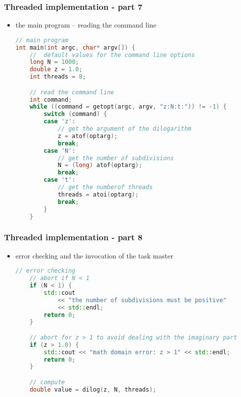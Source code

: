\begin{frame}[fragile]
%
  \frametitle{Threaded implementation - part 7}
%
  \begin{itemize}
  \item the main program -- reading the command line
  \begin{lstlisting}[language=c++,name=threaded]
// main program
int main(int argc, char* argv[]) {
    //  default values for the command line options
    long N = 1000;
    double z = 1.0;
    int threads = 8;

    // read the command line
    int command;
    while ((command = getopt(argc, argv, "z:N:t:")) != -1) {
        switch (command) {
        case 'z':
            // get the argument of the dilogarithm 
            z = atof(optarg);
            break;
        case 'N':
            // get the number of subdivisions
            N = (long) atof(optarg);
            break;
        case 't':
            // get the numberof threads
            threads = atoi(optarg);
            break;
        }
    }

  \end{lstlisting}
%
  \end{itemize}
%
\end{frame}

\begin{frame}[fragile]
%
  \frametitle{Threaded implementation - part 8}
%
  \begin{itemize}
  \item error checking and the invocation of the task master
  \begin{lstlisting}[language=c++,name=threaded]
    // error checking
    // abort if N < 1
    if (N < 1) {
        std::cout 
            << "the number of subdivisions must be positive"
            << std::endl;
        return 0;
    }

    // abort for z > 1 to avoid dealing with the imaginary part
    if (z > 1.0) {
        std::cout << "math domain error: z > 1" << std::endl;
        return 0;
    } 

    // compute
    double value = dilog(z, N, threads);

  \end{lstlisting}
%
  \end{itemize}
%
\end{frame}

